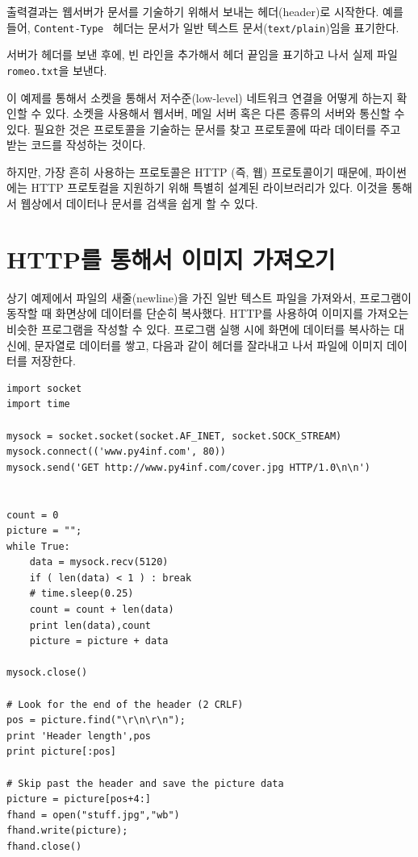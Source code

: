 출력결과는 웹서버가 문서를 기술하기 위해서 보내는 헤더(header)로 시작한다.
예를 들어, {\tt Content-Type } 헤더는 문서가 일반 텍스트 문서({\tt text/plain})임을 표기한다.

서버가 헤더를 보낸 후에, 빈 라인을 추가해서 헤더 끝임을 표기하고 나서 실제 파일{\tt romeo.txt}을 보낸다.

이 예제를 통해서 소켓을 통해서 저수준(low-level) 네트워크 연결을 어떻게 하는지 확인할 수 있다.
소켓을 사용해서 웹서버, 메일 서버 혹은 다른 종류의 서버와 통신할 수 있다.
필요한 것은 프로토콜을 기술하는 문서를 찾고 프로토콜에 따라 데이터를 주고 받는 코드를 작성하는 것이다.

하지만, 가장 흔히 사용하는 프로토콜은 HTTP (즉, 웹) 프로토콜이기 때문에, 
파이썬에는 HTTP 프로토컬을 지원하기 위해 특별히 설계된 라이브러리가 있다.
이것을 통해서 웹상에서 데이터나 문서를 검색을 쉽게 할 수 있다.

\section{HTTP를 통해서 이미지 가져오기}


상기 예제에서 파일의 새줄(newline)을 가진 일반 텍스트 파일을 가져와서, 프로그램이 동작할 때 화면상에 데이터를 단순히 복사했다.
HTTP를 사용하여 이미지를 가져오는 비슷한 프로그램을 작성할 수 있다. 프로그램 실행 시에 화면에 데이터를 복사하는 대신에,
문자열로 데이터를 쌓고, 다음과 같이 헤더를 잘라내고 나서 파일에 이미지 데이터를 저장한다. 

\beforeverb
\begin{verbatim}
import socket
import time

mysock = socket.socket(socket.AF_INET, socket.SOCK_STREAM)
mysock.connect(('www.py4inf.com', 80))
mysock.send('GET http://www.py4inf.com/cover.jpg HTTP/1.0\n\n')


count = 0
picture = "";
while True:
    data = mysock.recv(5120)
    if ( len(data) < 1 ) : break
    # time.sleep(0.25)
    count = count + len(data)
    print len(data),count
    picture = picture + data

mysock.close()

# Look for the end of the header (2 CRLF)
pos = picture.find("\r\n\r\n");
print 'Header length',pos
print picture[:pos]

# Skip past the header and save the picture data
picture = picture[pos+4:]
fhand = open("stuff.jpg","wb")
fhand.write(picture);
fhand.close()
\end{verbatim}
\afterverb
%

